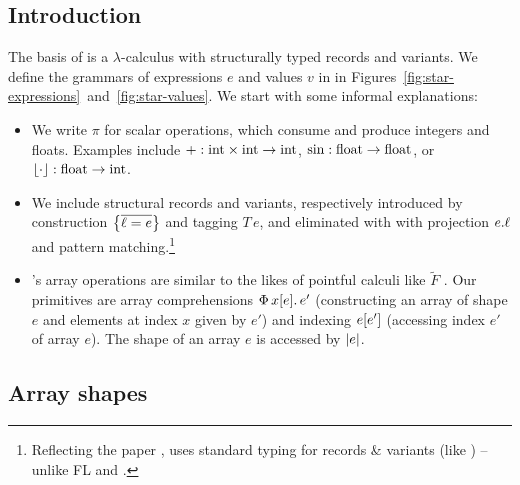 \subsection{Introduction}
\label{subsec:star-intro}

The basis of \starr{} is a $\lambda$-calculus with structurally typed records and variants. We define the grammars of expressions $e$ and values $v$ in \starr{} in Figures~\ref{fig:star-expressions}~and~\ref{fig:star-values}.
We start with some informal explanations:

\begin{itemize}
    \item We write $\pi$ for scalar operations, which consume and produce integers and floats. Examples include $+: \mathrm{int} \times \mathrm{int} \to \mathrm{int}$, $\mathrm{sin} : \mathrm{float} \to \mathrm{float}$, or $\lfloor \cdot \rfloor : \mathrm{float} \to \mathrm{int}$.
    \item We include structural records and variants, respectively introduced by construction $\srecordval{\overline{\ell = e}}$ and tagging $T\,e$, and eliminated with with projection ${e}{.}{\ell}$ and pattern matching.\footnote{Reflecting the paper \cite{star}, \starr{} uses standard typing for records \& variants (like \textcite{tapl}) -- unlike FL and \fabric{}.}
    \item \starr{}'s array operations are similar to the likes of pointful calculi like $\tilde F$ \cite{f-smooth}. Our primitives are array comprehensions $\sbuild{x}{e}{e'}$ (constructing an array of shape $e$ and elements at index $x$ given by $e'$) and indexing $\sindex{e}{e'}$ (accessing index $e'$ of array $e$).
    The shape of an array $e$ is accessed by $\sshape{e}$.
\end{itemize}

\subsection{Array shapes}
\label{subsec:array-shapes}

